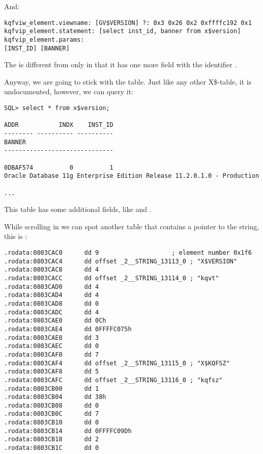 And:

\begin{lstlisting}[caption=Result of \OracleTablesName]
kqfviw_element.viewname: [GV$VERSION] ?: 0x3 0x26 0x2 0xffffc192 0x1
kqfvip_element.statement: [select inst_id, banner from x$version]
kqfvip_element.params:
[INST_ID] [BANNER] 
\end{lstlisting}

The   is different from  only in that it has one more field with the identifier .

Anyway, we are going to stick with the  table. Just like any other X\$-table, it is undocumented, however, we can query it:

\begin{lstlisting}
SQL> select * from x$version;

ADDR           INDX    INST_ID
-------- ---------- ----------
BANNER
------------------------------

0DBAF574          0          1
Oracle Database 11g Enterprise Edition Release 11.2.0.1.0 - Production

...
\end{lstlisting}

This table has some additional fields, like  and .

While scrolling  in \IDA we can spot another table that contains a pointer to the  string, this is :

\begin{lstlisting}[caption=kqf.o]
.rodata:0803CAC0      dd 9                    ; element number 0x1f6
.rodata:0803CAC4      dd offset _2__STRING_13113_0 ; "X$VERSION"
.rodata:0803CAC8      dd 4
.rodata:0803CACC      dd offset _2__STRING_13114_0 ; "kqvt"
.rodata:0803CAD0      dd 4
.rodata:0803CAD4      dd 4
.rodata:0803CAD8      dd 0
.rodata:0803CADC      dd 4
.rodata:0803CAE0      dd 0Ch
.rodata:0803CAE4      dd 0FFFFC075h
.rodata:0803CAE8      dd 3
.rodata:0803CAEC      dd 0
.rodata:0803CAF0      dd 7
.rodata:0803CAF4      dd offset _2__STRING_13115_0 ; "X$KQFSZ"
.rodata:0803CAF8      dd 5
.rodata:0803CAFC      dd offset _2__STRING_13116_0 ; "kqfsz"
.rodata:0803CB00      dd 1
.rodata:0803CB04      dd 38h
.rodata:0803CB08      dd 0
.rodata:0803CB0C      dd 7
.rodata:0803CB10      dd 0
.rodata:0803CB14      dd 0FFFFC09Dh
.rodata:0803CB18      dd 2
.rodata:0803CB1C      dd 0
\end{lstlisting}

